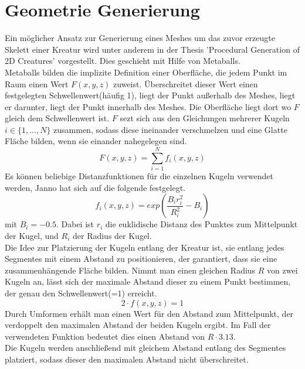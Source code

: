 \section{Geometrie Generierung}
Ein möglicher Ansatz zur Generierung eines Meshes um das zuvor erzeugte Skelett einer Kreatur wird unter anderem in der Thesis 'Procedural Generation of 2D Creatures' \cite{Janno20182dCG} vorgestellt. Dies geschieht mit Hilfe von Metaballs.\\
Metaballs bilden die implizite Definition einer Oberfläche, die jedem Punkt im Raum einen Wert $F(x,y,z)$ zuweist. Überschreitet dieser Wert einen festgelegten Schwellenwert(häufig 1), liegt der Punkt außerhalb des Meshes, liegt er darunter, liegt der Punkt innerhalb des Meshes. Die Oberfläche liegt dort wo $F$ gleich dem Schwellenwert ist. $F$ sezt sich aus den Gleichungen mehrerer Kugeln $i\in \{ 1, ..., N\}$ zusammen, sodass diese ineinander verschmelzen und eine Glatte Fläche bilden, wenn sie einander nahegelegen sind.
\[F(x,y,z) = \sum_{i=1}^{N}{f_i(x,y,z)}\]
Es können beliebige Distanzfunktionen für die einzelnen Kugeln verwendet werden, Janno hat sich auf die folgende festgelegt.
\[f_i(x,y,z)=exp(\frac{B_ir_i^2}{R_i^2}-B_i)\]
mit $B_i=-0.5$. Dabei ist $r_i$ die euklidische Distanz des Punktes zum Mittelpunkt der Kugel, und $R_i$ der Radius der Kugel.\\
Die Idee zur Platzierung der Kugeln entlang der Kreatur ist, sie entlang jedes Segmentes mit einem Abstand zu positionieren, der garantiert, dass sie eine zusammenhängende Fläche bilden. Nimmt man einen gleichen Radius $R$ von zwei Kugeln an, lässt sich der maximale Abstand dieser zu einem Punkt bestimmen, der genau den Schwellenwert(=1) erreicht.
\[2\cdot f(x,y,z) = 1\]
Durch Umformen erhält man einen Wert für den Abstand zum Mittelpunkt, der verdoppelt den maximalen Abstand der beiden Kugeln ergibt. Im Fall der verwendeten Funktion bedeutet dies einen Abstand von $R \cdot 3.13$.\\
Die Kugeln werden anschließend mit gleichem Abstand entlang des Segmentes platziert, sodass dieser den maximalen Abstand nicht überschreitet.

